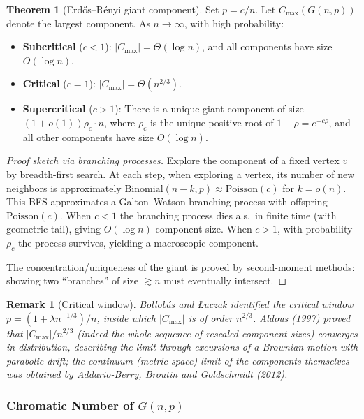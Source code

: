 \documentclass{article}
\newtheorem{remark}{Remark}
\theoremstyle{definition}
\newtheorem{theorem}{Theorem}
\begin{document}
\begin{theorem}[Erd\H{o}s--R\'enyi giant component]\label{thm:giant}
Set $p = c/n$. Let $C_{\max}(G(n, p))$ denote the largest component.
As $n \to \infty$, with high probability:
\begin{itemize}
  \item \textbf{Subcritical} ($c < 1$): $|C_{\max}| = \Theta(\log n)$,
        and all components have size $O(\log n)$.
  \item \textbf{Critical} ($c = 1$): $|C_{\max}| = \Theta(n^{2/3})$.
  \item \textbf{Supercritical} ($c > 1$): There is a unique giant
        component of size $(1 + o(1))\rho_c \cdot n$, where $\rho_c$
        is the unique positive root of $1 - \rho = e^{-c\rho}$, and
        all other components have size $O(\log n)$.
\end{itemize}
\end{theorem}

\begin{proof}[Proof sketch via branching processes]
Explore the component of a fixed vertex $v$ by breadth-first search.
At each step, when exploring a vertex, its number of new neighbors is
approximately $\mathrm{Binomial}(n - k, p) \approx \mathrm{Poisson}(c)$
for $k = o(n)$. This BFS approximates a Galton--Watson branching
process with offspring $\mathrm{Poisson}(c)$. When $c < 1$ the
branching process dies a.s.\ in finite time (with geometric tail),
giving $O(\log n)$ component size. When $c > 1$, with probability
$\rho_c$ the process survives, yielding a macroscopic component.

The concentration/uniqueness of the giant is proved by second-moment
methods: showing two ``branches'' of size $\gtrsim n$ must eventually
intersect.
\end{proof}

\begin{remark}[Critical window]
Bollob\'as and \L uczak identified the critical
window $p = (1 + \lambda n^{-1/3})/n$, inside which $|C_{\max}|$ is of
order $n^{2/3}$. Aldous (1997) proved that $|C_{\max}|/n^{2/3}$ (indeed the
whole sequence of rescaled component sizes) converges in distribution,
describing the limit through excursions of a Brownian motion with
parabolic drift; the continuum (metric-space) limit of the components
themselves was obtained by Addario-Berry, Broutin and Goldschmidt (2012).
\end{remark}

\subsubsection{Chromatic Number of $G(n, p)$}
\end{document}

